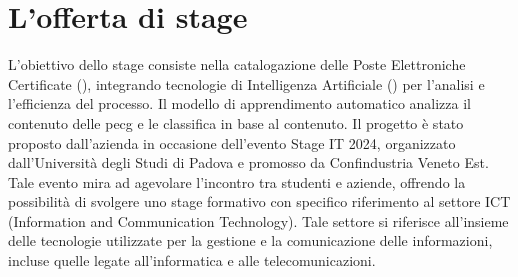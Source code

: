 \section{L'offerta di stage}
L'obiettivo dello stage consiste nella catalogazione delle Poste Elettroniche Certificate (), integrando tecnologie di Intelligenza Artificiale () per l'analisi e l'efficienza del processo. 
\newline
Il modello di apprendimento automatico analizza il contenuto delle \gls{pecg} e le classifica in base al contenuto. 
\newline
Il progetto è stato proposto dall'azienda in occasione dell'evento Stage IT 2024, organizzato dall'Università degli Studi di Padova e promosso da Confindustria Veneto Est. Tale evento mira ad agevolare l'incontro tra studenti e aziende, offrendo la possibilità di svolgere uno stage formativo con specifico riferimento al settore ICT (Information and Communication Technology). Tale settore si riferisce all'insieme delle tecnologie utilizzate per la gestione e la comunicazione delle informazioni, incluse quelle legate all'informatica e alle telecomunicazioni.

